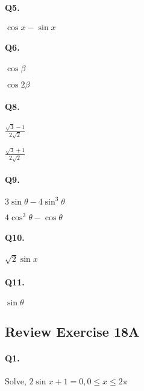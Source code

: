 \documentclass{article}
\begin{document}
\paragraph{Q5.}
$\cos x - \sin x$

\paragraph{Q6.}
\begin{enumerate*}[label=(\alph*)]
          \item $\cos\beta$
          \item $\cos 2\beta$
\end{enumerate*}

\paragraph{Q8.}
\begin{enumerate*}[label=(\alph*)]
          \item $\frac{\sqrt{3}-1}{2 \sqrt{2}}$
          \item $\frac{\sqrt{3}+1}{2 \sqrt{2}}$
\end{enumerate*}

\paragraph{Q9.}
\begin{enumerate*}[label=(\alph*)]
          \item $3\sin\theta - 4\sin^{3}\theta$
          \item $4\cos^{3}\theta - \cos\theta$
\end{enumerate*}

\paragraph{Q10.}
$\sqrt{2}\sin x$

\paragraph{Q11.}
$\sin\theta$

\subsection {Review Exercise 18A}

\paragraph{Q1.}
Solve, $2\sin x + 1=0, 0 \leq x \leq 2\pi$
\end{document}
